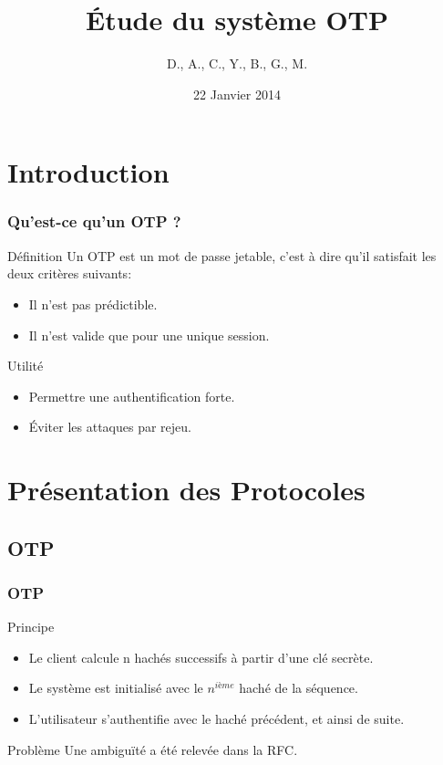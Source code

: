\documentclass{beamer}
\title{Étude du système OTP}
\author{D.\bsc{Picard}, A.\bsc{Smondack}, C.\bsc{Hardouin}, Y.\bsc{Adegoloye}, B.\bsc{Zigh}, G.\bsc{Ferry}, M.\bsc{Michotte}}
\institute{Université de Rouen}
\date{22 Janvier 2014}
\begin{document}
\begin{frame} 
\titlepage
\end{frame}


\section{Introduction}
\begin{frame}
\frametitle{Qu'est-ce qu'un OTP ?}
\begin{block}{Définition}
    Un OTP est un mot de passe jetable, c'est à dire qu'il satisfait les deux 
  critères suivants:
  \begin{itemize}
    \item Il n'est pas prédictible.
    \item Il n'est valide que pour une unique session.
  \end{itemize}
\end{block}

\begin{block}{Utilité}
  \begin{itemize}
    \item Permettre une authentification forte.
    \item Éviter les attaques par rejeu.
  \end{itemize}
\end{block}
\end{frame}

\section{Présentation des Protocoles}
\subsection{OTP}
\begin{frame}
\frametitle{OTP}
\begin{block}{Principe}
\begin{itemize}
 \item Le client calcule n hachés successifs à partir d'une clé secrète.
 \item Le système est initialisé avec le $n^{ième}$ haché de la séquence.
 \item L'utilisateur s'authentifie avec le haché précédent, et ainsi de suite.
\end{itemize}
\end{block}

\begin{block}{Problème}
Une ambiguïté a été relevée dans la RFC.
\end{block}
\end{frame}
\end{document}

